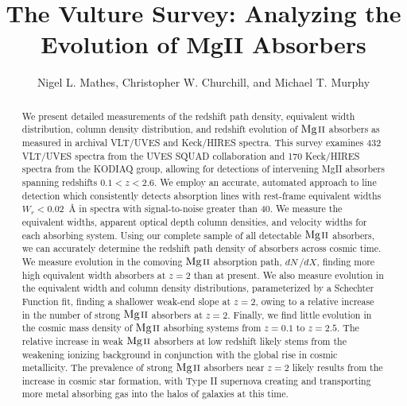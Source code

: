 \documentclass[iop,apj,numberedappendix,appendixfloats,twocolappendix]{emulateapj}
\begin{document}
\title{The Vulture Survey: Analyzing the Evolution of MgII Absorbers}

\author{
Nigel L. Mathes,
Christopher W. Churchill,
and
Michael T. Murphy
}


\begin{abstract}
We present detailed measurements of the redshift path density, equivalent width distribution, column density distribution, and redshift evolution of ${\hbox{{\rm Mg}\kern 0.1em{\sc ii}}}$ absorbers as measured in archival VLT/UVES and Keck/HIRES spectra. This survey examines 432 VLT/UVES spectra from the UVES SQUAD collaboration and 170 Keck/HIRES spectra from the KODIAQ group, allowing for detections of intervening MgII absorbers spanning redshifts $0.1 < z < 2.6$. We employ an accurate, automated approach to line detection which consistently detects absorption lines with rest-frame equivalent widths $W_r < 0.02$~{\AA} in spectra with signal-to-noise greater than 40. We measure the equivalent widths, apparent optical depth column densities, and velocity widths for each absorbing system. Using our complete sample of all detectable ${\hbox{{\rm Mg}\kern 0.1em{\sc ii}}}$ absorbers, we can accurately determine the redshift path density of absorbers across cosmic time. We measure evolution in the comoving ${\hbox{{\rm Mg}\kern 0.1em{\sc ii}}}$ absorption path, $dN\,/dX$, finding more high equivalent width absorbers at $z = 2$ than at present. We also measure evolution in the equivalent width and column density distributions, parameterized by a Schechter Function fit, finding a shallower weak-end slope at $z = 2$, owing to a relative increase in the number of strong ${\hbox{{\rm Mg}\kern 0.1em{\sc ii}}}$ absorbers at $z = 2$. Finally, we find little evolution in the cosmic mass density of ${\hbox{{\rm Mg}\kern 0.1em{\sc ii}}}$ absorbing systems from $z = 0.1$ to $z = 2.5$. The relative increase in weak ${\hbox{{\rm Mg}\kern 0.1em{\sc ii}}}$ absorbers at low redshift likely stems from the weakening ionizing background in conjunction with the global rise in cosmic metallicity. The prevalence of strong ${\hbox{{\rm Mg}\kern 0.1em{\sc ii}}}$ absorbers near $z = 2$ likely results from the increase in cosmic star formation, with Type II supernova creating and transporting more metal absorbing gas into the halos of galaxies at this time.

\end{abstract}

\end{document}
